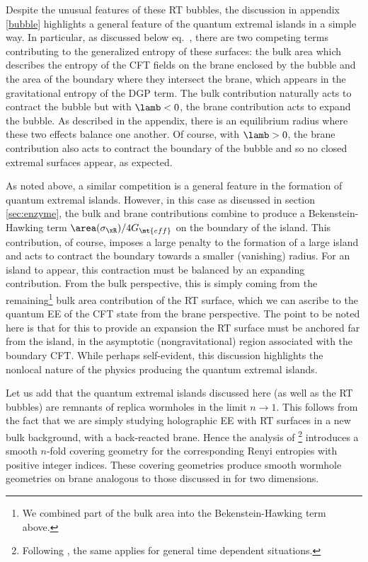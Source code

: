 Despite the unusual features of these RT bubbles, the discussion in appendix \ref{bubble} highlights a general feature of the quantum extremal islands in a simple way. In particular, as discussed below eq.~, there are two competing terms contributing to the generalized entropy of these surfaces: the bulk area which describes the entropy of the CFT fields on the brane enclosed by the bubble and the area of the boundary where they intersect the brane, which appears in the gravitational entropy of the DGP term. The bulk contribution naturally acts to contract the bubble but with $\lamb<0$, the brane contribution acts to expand the bubble. As described in the appendix, there is an equilibrium radius where these two effects balance one another. Of course, with $\lamb>0$, the brane contribution also acts to contract the boundary of the bubble and so no closed extremal surfaces appear, as expected.

As noted above, a similar competition is a general feature in the formation of quantum extremal islands. However, in this case as discussed in section \ref{sec:enzyme}, the bulk and brane contributions combine to produce a Bekenstein-Hawking term $\area(\sigma_\xR)/{4G_\mt{eff}}$ on the boundary of the island. This contribution, of course, imposes a large penalty to the formation of a large island and acts to contract the boundary towards a smaller (\ie vanishing) radius. For an island to appear, this contraction must be balanced by an expanding contribution. From the bulk perspective, this is simply coming from the remaining\footnote{We combined part of the bulk area into the Bekenstein-Hawking term above.} bulk area contribution of the RT surface, which we can ascribe to the quantum EE of the CFT state from the brane perspective. The point to be noted here is that for this to provide an expansion the RT surface must be anchored far from the island, \ie in the asymptotic (nongravitational) region associated with the boundary CFT. While perhaps self-evident, this discussion highlights the nonlocal nature of the physics producing the quantum extremal islands.

Let us add that the quantum extremal islands discussed here (as well as the RT bubbles) are remnants of replica wormholes in the limit $n\to1$. This follows from the fact that we are simply studying holographic EE with RT surfaces in a new bulk background, \ie with a back-reacted brane. Hence the analysis of \cite{Lewkowycz:2013nqa}\footnote{Following \cite{Dong:2016hjy,Faulkner:2017vdd}, the same applies for general time dependent situations.} introduces a smooth $n$-fold covering geometry for the corresponding Renyi entropies with positive integer indices. These covering geometries produce smooth wormhole geometries on brane analogous to those discussed in \cite{Almheiri:2019qdq,Penington:2019kki} for two dimensions. 

